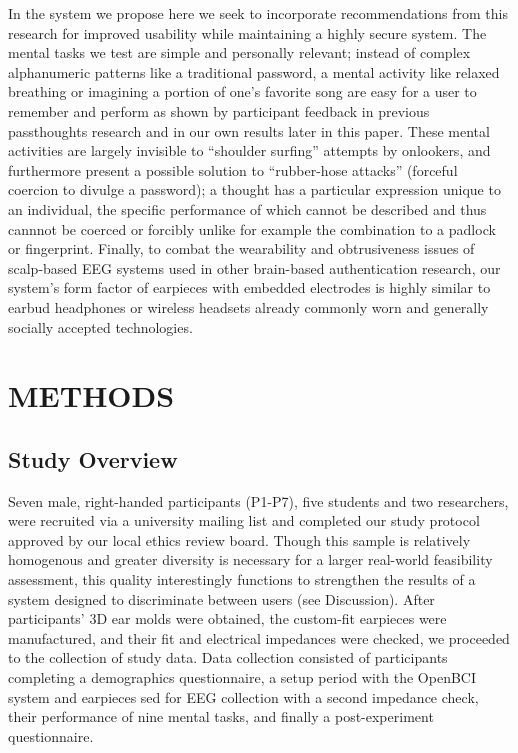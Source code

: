 \documentclass[a4paper,twoside]{article}
\begin{document}
In the system we propose here we seek to incorporate recommendations from this research for improved usability while maintaining a highly secure system. The mental tasks we test are simple and personally relevant; instead of complex alphanumeric patterns like a traditional password, a mental activity like relaxed breathing or imagining a portion of one's favorite song are easy for a user to remember and perform as shown by participant feedback in previous passthoughts research and in our own results later in this paper. These mental activities are largely invisible to ``shoulder surfing'' attempts by onlookers, and furthermore present a possible solution to ``rubber-hose attacks'' (forceful coercion to divulge a password); a thought has a particular expression unique to an individual, the specific performance of which cannot be described and thus cannnot be coerced or forcibly unlike for example the combination to a padlock or fingerprint. Finally, to combat the wearability and obtrusiveness issues of scalp-based EEG systems used in other brain-based authentication research, our system's form factor of earpieces with embedded electrodes is highly similar to earbud headphones or wireless headsets already commonly worn and generally socially accepted technologies.

\section{\uppercase{Methods}}
\label{sec:methods}

\subsection{Study Overview}

\noindent Seven male, right-handed participants (P1-P7), five students and two researchers, were recruited via a university mailing list and completed our study protocol approved by our local ethics review board. Though this sample is relatively homogenous and greater diversity is necessary for a larger real-world feasibility assessment, this quality interestingly functions to strengthen the results of a system designed to discriminate between users (see Discussion). After participants' 3D ear molds were obtained, the custom-fit earpieces were manufactured, and their fit and electrical impedances were checked, we proceeded to the collection of study data.
Data collection consisted of participants completing a demographics questionnaire, a setup period with the OpenBCI system and earpieces sed for EEG collection with a second impedance check, their performance of nine mental tasks, and finally a post-experiment questionnaire.
\end{document}
